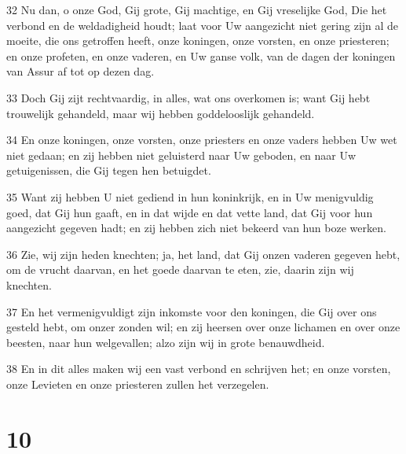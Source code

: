 \par 32 Nu dan, o onze God, Gij grote, Gij machtige, en Gij vreselijke God, Die het verbond en de weldadigheid houdt; laat voor Uw aangezicht niet gering zijn al de moeite, die ons getroffen heeft, onze koningen, onze vorsten, en onze priesteren; en onze profeten, en onze vaderen, en Uw ganse volk, van de dagen der koningen van Assur af tot op dezen dag.
\par 33 Doch Gij zijt rechtvaardig, in alles, wat ons overkomen is; want Gij hebt trouwelijk gehandeld, maar wij hebben goddelooslijk gehandeld.
\par 34 En onze koningen, onze vorsten, onze priesters en onze vaders hebben Uw wet niet gedaan; en zij hebben niet geluisterd naar Uw geboden, en naar Uw getuigenissen, die Gij tegen hen betuigdet.
\par 35 Want zij hebben U niet gediend in hun koninkrijk, en in Uw menigvuldig goed, dat Gij hun gaaft, en in dat wijde en dat vette land, dat Gij voor hun aangezicht gegeven hadt; en zij hebben zich niet bekeerd van hun boze werken.
\par 36 Zie, wij zijn heden knechten; ja, het land, dat Gij onzen vaderen gegeven hebt, om de vrucht daarvan, en het goede daarvan te eten, zie, daarin zijn wij knechten.
\par 37 En het vermenigvuldigt zijn inkomste voor den koningen, die Gij over ons gesteld hebt, om onzer zonden wil; en zij heersen over onze lichamen en over onze beesten, naar hun welgevallen; alzo zijn wij in grote benauwdheid.
\par 38 En in dit alles maken wij een vast verbond en schrijven het; en onze vorsten, onze Levieten en onze priesteren zullen het verzegelen.

\chapter{10}


